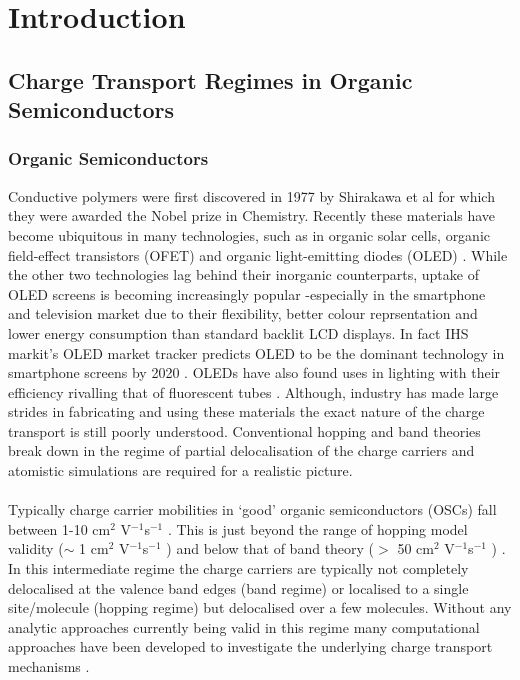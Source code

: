 \chapter{Introduction}
\label{chapterlabel1}
\section{Charge Transport Regimes in Organic Semiconductors}
\subsection{Organic Semiconductors}
Conductive polymers were first discovered in 1977 by Shirakawa et al  \cite{chiang_electrical_1977, Shirakawa1977Jan} for which they were awarded the Nobel prize in Chemistry. Recently these materials have become ubiquitous in many technologies, such as in organic solar cells\cite{Kippelen2009}, organic field-effect transistors (OFET) \cite{Malachowski2010Jun} and organic light-emitting diodes (OLED) \cite{ThejoKalyani2012Jun}. While the other two technologies lag behind their inorganic counterparts, uptake of OLED screens is becoming increasingly popular -especially in the smartphone and television market due to their flexibility, better colour reprsentation and lower energy consumption than standard backlit LCD displays. In fact IHS markit's OLED market tracker predicts OLED to be the dominant technology in smartphone screens by 2020 \cite{IHSMarkit}. OLEDs have also found uses in lighting with their efficiency rivalling that of fluorescent tubes \cite{Reineke2009May, OLED_lighting}. Although, industry has made large strides in fabricating and using these materials the exact nature of the charge transport is still poorly understood. Conventional hopping and band theories break down in the regime of partial delocalisation of the charge carriers and atomistic simulations are required for a realistic picture.
\\\\
Typically charge carrier mobilities in `good' organic semiconductors (OSCs) fall between 1-10 cm$^2$ V$^{-1}$s$^{-1}$ \cite{Brown2018Mar}. This is just beyond the range of hopping model validity ($\sim $ 1 cm$^2$ V$^{-1}$s$^{-1}$ ) and below that of band theory ($>$ 50 cm$^2$ V$^{-1}$s$^{-1}$ )
 \cite{yavuz_dichotomy_2017}. In this intermediate regime the charge carriers are typically not completely delocalised at the valence band edges (band regime) or localised to a single site/molecule (hopping regime) but delocalised over a few molecules. Without any analytic approaches currently being valid in this regime many computational approaches have been developed to investigate the underlying charge transport mechanisms \cite{oberhofer_charge_2017}.
